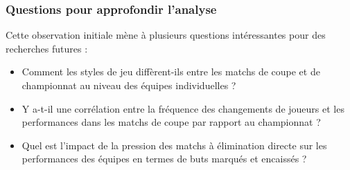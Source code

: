 \documentclass[
]{article}
\providecommand{\tightlist}{%
  \setlength{\itemsep}{0pt}\setlength{\parskip}{0pt}}
\begin{document}
\subsubsection{Questions pour approfondir
l'analyse}\label{questions-pour-approfondir-lanalyse}

Cette observation initiale mène à plusieurs questions intéressantes pour
des recherches futures :

\begin{itemize}
\tightlist
\item
  Comment les styles de jeu diffèrent-ils entre les matchs de coupe et
  de championnat au niveau des équipes individuelles ?
\item
  Y a-t-il une corrélation entre la fréquence des changements de joueurs
  et les performances dans les matchs de coupe par rapport au
  championnat ?
\item
  Quel est l'impact de la pression des matchs à élimination directe sur
  les performances des équipes en termes de buts marqués et encaissés ?
\end{itemize}
\end{document}
